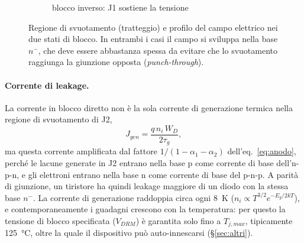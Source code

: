 \documentclass[11pt,a4paper]{article}
\newcommand{\VAK}{\ensuremath{V_{AK}}}
\newcommand{\VDRM}{\ensuremath{V_{DRM}}}
\newcommand{\en}[1]{\emph{#1}}   %
\begin{document}
\begin{figure}[htbp]
\begin{subfigure}[b]{0.48\textwidth}
\caption{blocco inverso: J1 sostiene la tensione}
\end{subfigure}
\caption{Regione di svuotamento (tratteggio) e profilo del campo elettrico nei due stati di blocco. In entrambi i casi il campo si sviluppa nella base $n^-$, che deve essere abbastanza spessa da evitare che lo svuotamento raggiunga la giunzione opposta (\en{punch-through}).}
\label{fig:campo}
\end{figure}

\paragraph{Corrente di leakage.} La corrente in blocco diretto non è la sola corrente di generazione termica nella regione di svuotamento di J2,
\begin{equation}
  J_{gen} = \frac{q\,n_i\,W_D}{2\tau_g},
\end{equation}
ma questa corrente amplificata dal fattore $1/(1-\alpha_1-\alpha_2)$ dell'eq.~\eqref{eq:anodo}, perché le lacune generate in J2 entrano nella base p come corrente di base dell'n-p-n, e gli elettroni entrano nella base n come corrente di base del p-n-p. A parità di giunzione, un tiristore ha quindi leakage maggiore di un diodo con la stessa base $n^-$. La corrente di generazione raddoppia circa ogni \qty{8}{\K} ($n_i \propto T^{3/2}e^{-E_g/2kT}$), e contemporaneamente i guadagni crescono con la temperatura: per questo la tensione di blocco specificata ($\VDRM$) è garantita solo fino a $T_{j,max}$, tipicamente \qty{125}{\celsius}, oltre la quale il dispositivo può auto-innescarsi (\S\ref{sec:altri}).
\end{document}
